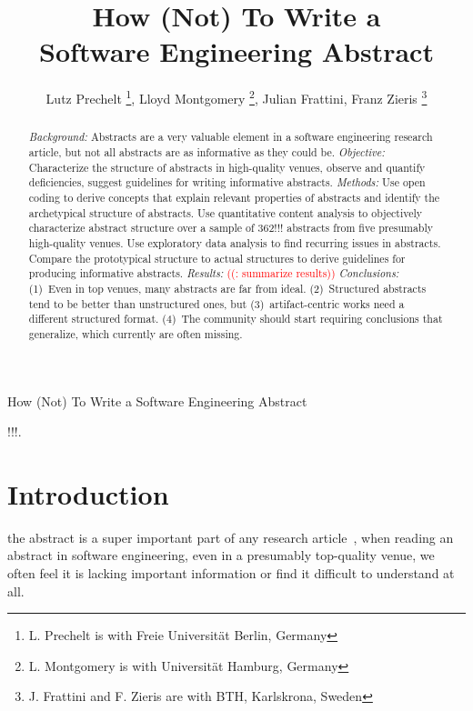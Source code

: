 \documentclass[10pt,journal,compsoc]{IEEEtran}
\newcounter{todonumber}
\newcommand{\Todo}[1]{\stepcounter{todonumber}\textcolor{red}{\sffamily ((\arabic{todonumber}: #1))}}
\begin{document}
\title{How (Not) To Write a\\Software Engineering Abstract}

\author{Lutz Prechelt%
\thanks{L. Prechelt is with Freie Universität Berlin, Germany},
Lloyd Montgomery%
\thanks{L. Montgomery is with Universität Hamburg, Germany},
Julian Frattini, Franz Zieris%
\thanks{J. Frattini and F. Zieris are with BTH, Karlskrona, Sweden}}

%
{How (Not) To Write a Software Engineering Abstract}

\maketitle

\begin{abstract}  %
\emph{Background:}
Abstracts are a very valuable element in a software engineering research article,
but not all abstracts are as informative as they could be.
\emph{Objective:}
Characterize the structure of abstracts in high-quality venues,
observe and quantify deficiencies,
suggest guidelines for writing informative abstracts.
\emph{Methods:}
Use open coding to derive concepts that explain relevant properties of abstracts
and identify the archetypical structure of abstracts.
Use quantitative content analysis to objectively characterize abstract structure
over a sample of 362!!! abstracts from five presumably high-quality venues.
Use exploratory data analysis to find recurring issues in abstracts.
Compare the prototypical structure to actual structures to derive
guidelines for producing informative abstracts.
\emph{Results:}
\Todo{summarize results}
\emph{Conclusions:}
(1)~Even in top venues, many abstracts are far from ideal.
(2)~Structured abstracts tend to be better than unstructured ones,
but (3)~artifact-centric works need a different structured format.
(4)~The community should start requiring conclusions that generalize,
which currently are often missing.
\end{abstract}

\begin{IEEEkeywords}
!!!.
\end{IEEEkeywords}


\section{Introduction}
 the abstract is a super important part of any research article~\cite{Lang22},
when reading an abstract in software engineering, even in a presumably top-quality venue,
we often feel it is lacking important information or find it difficult to understand at all.
\end{document}
